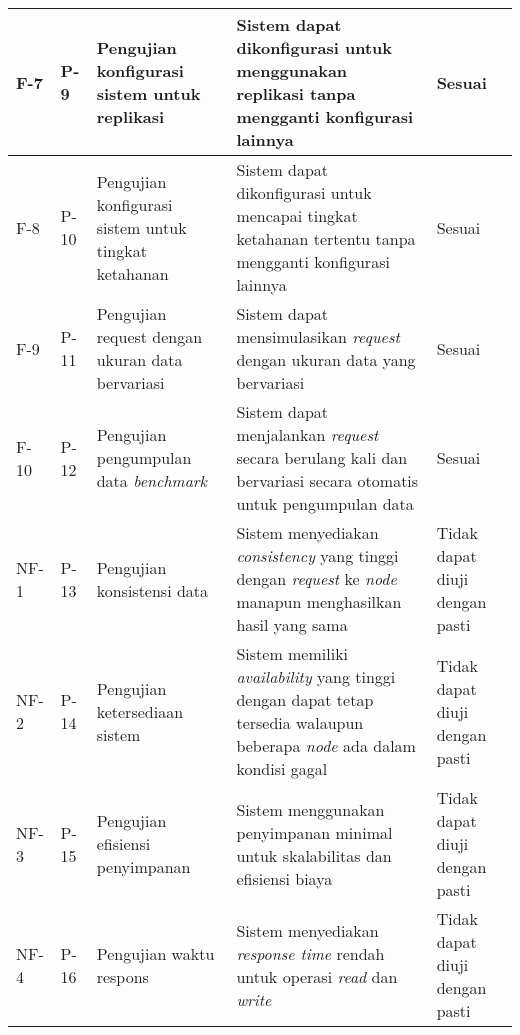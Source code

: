 \begin{longtable}{|p{2cm}|p{2cm}|p{3cm}|p{3cm}|p{2cm}|}
	F-7                              & P-9          & Pengujian konfigurasi sistem untuk replikasi                     & Sistem dapat dikonfigurasi untuk menggunakan replikasi tanpa mengganti konfigurasi lainnya                                            & Sesuai                         \\ \hline
	F-8                              & P-10         & Pengujian konfigurasi sistem untuk tingkat ketahanan             & Sistem dapat dikonfigurasi untuk mencapai tingkat ketahanan tertentu tanpa mengganti konfigurasi lainnya                              & Sesuai                         \\ \hline
	F-9                              & P-11         & Pengujian request dengan ukuran data bervariasi                  & Sistem dapat mensimulasikan \textit{request} dengan ukuran data yang bervariasi                                                       & Sesuai                         \\ \hline
	F-10                             & P-12         & Pengujian pengumpulan data \textit{benchmark}                    & Sistem dapat menjalankan \textit{request} secara berulang kali dan bervariasi secara otomatis untuk pengumpulan data                  & Sesuai                         \\ \hline
	NF-1                             & P-13         & Pengujian konsistensi data                                       & Sistem menyediakan \textit{consistency} yang tinggi dengan \textit{request} ke \textit{node} manapun menghasilkan hasil yang sama     & Tidak dapat diuji dengan pasti \\ \hline
	NF-2                             & P-14         & Pengujian ketersediaan sistem                                    & Sistem memiliki \textit{availability} yang tinggi dengan dapat tetap tersedia walaupun beberapa \textit{node} ada dalam kondisi gagal & Tidak dapat diuji dengan pasti \\ \hline
	NF-3                             & P-15         & Pengujian efisiensi penyimpanan                                  & Sistem menggunakan penyimpanan minimal untuk skalabilitas dan efisiensi biaya                                                         & Tidak dapat diuji dengan pasti \\ \hline
	NF-4                             & P-16         & Pengujian waktu respons                                          & Sistem menyediakan \textit{response time} rendah untuk operasi \textit{read} dan \textit{write}                                       & Tidak dapat diuji dengan pasti \\ \hline
\end{longtable}